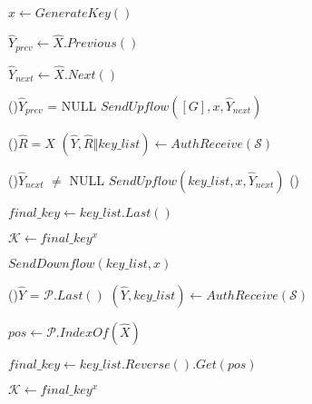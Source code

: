   \Begin
  {
    $x \leftarrow GenerateKey()$

    $\hat{Y}_{prev} \leftarrow \hat{X}.Previous()$

    $\hat{Y}_{next} \leftarrow \hat{X}.Next()$

    \uIf(){$\hat{Y}_{prev}$ = NULL}
    {
      $SendUpflow([G], x, \hat{Y}_{next})$
    }
    \Else
    {

      \Repeat(){$\hat{R} = \hat{X}$}
      {
        $(\hat{Y}, \hat{R} \Vert key\_list) \leftarrow AuthReceive(\mathcal{S})$
      }

      {
      }
      \uIf(){$\hat{Y}_{next}$ $\neq$ NULL}
      {
        $SendUpflow(key\_list, x, \hat{Y}_{next})$
      }
      \Else()
      {
        $final\_key \leftarrow key\_list.Last()$

        $\mathcal{K} \leftarrow final\_key^x$

        $SendDownflow(key\_list, x)$

      }
    }

    \Repeat(){$\hat{Y}$ = $\mathcal{P}.Last()$}
    {
      $(\hat{Y}, key\_list) \leftarrow AuthReceive(\mathcal{S})$
    }
    {
    }

    $pos \leftarrow \mathcal{P}.IndexOf(\hat{X})$

    $final\_key \leftarrow key\_list.Reverse().Get(pos)$

    $\mathcal{K} \leftarrow final\_key^x$

  }

